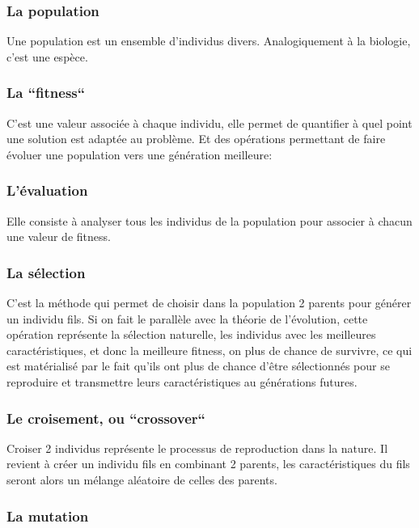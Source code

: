 \documentclass[12pt]{article}
\begin{document}
\subsubsection*{La population}

Une population est un ensemble d'individus divers. Analogiquement à la biologie, c'est une espèce.    

\subsubsection*{La ``fitness``}

C'est une valeur associée à chaque individu, elle permet de quantifier à quel point
une solution est adaptée au problème.
Et des opérations permettant de faire évoluer une population vers une génération meilleure:

\subsubsection*{L'évaluation}

Elle consiste à analyser tous les individus de la population pour associer à chacun une valeur de fitness.

\subsubsection*{La sélection}

C'est la méthode qui permet de choisir dans la population 2 parents pour générer un individu fils.
Si on fait le parallèle avec la théorie de l'évolution, cette opération représente la sélection naturelle,
les individus avec les meilleures caractéristiques, et donc la meilleure fitness, on plus de chance de survivre,
ce qui est matérialisé par le fait qu'ils ont plus de chance d'être sélectionnés pour se reproduire et transmettre
leurs caractéristiques au générations futures.

\subsubsection*{Le croisement, ou ``crossover``}

Croiser 2 individus représente le processus de reproduction dans la nature. Il revient à créer un individu fils
en combinant 2 parents, les caractéristiques du fils seront alors un mélange aléatoire de celles des parents.

\subsubsection*{La mutation}
\end{document}

